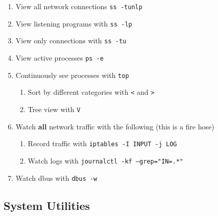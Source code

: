 \documentclass[12pt,letterpaper]{article}
\def\code#1{\textcolor{iris}{\texttt{#1}}}
\def\bf#1{\textbf{#1}}
\begin{document}
\begin{enumerate}
	\item View all network connections \code{ss -tunlp}
	\item View listening programs with \code{ss -lp}
	\item View only connections with \code{ss -tu}
	\item View active processes \code{ps -e}
	\item Continuously see processes with \code{top}
		\begin{enumerate}
			\item Sort by different categories with \code{<} and \code{>}
			\item Tree view with \code{V}
		\end{enumerate}
	\item Watch \bf{all} network traffic with the following (this is a fire hose)
		\begin{enumerate}
			\item Record traffic with \code{iptables -I INPUT -j LOG}
			\item Watch logs with \code{journalctl -kf --grep="IN=.*"}
		\end{enumerate}
	\item Watch dbus with \code{dbus -w}
\end{enumerate}

\subsection{System Utilities}
\end{document}
